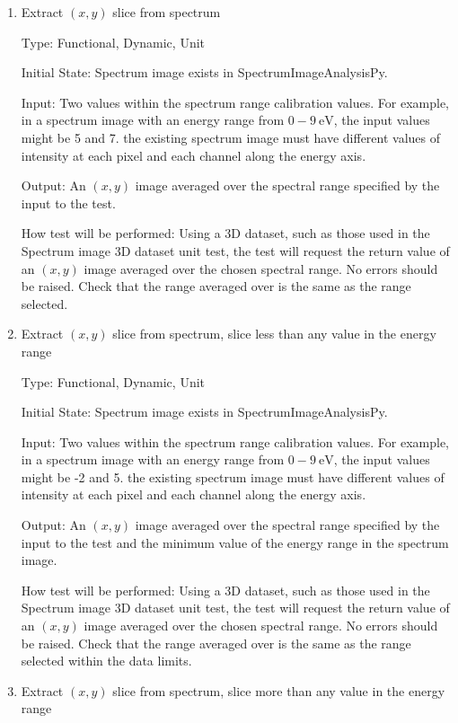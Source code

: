 \documentclass[12pt, titlepage]{article}
\newcommand{\progname}{SpectrumImageAnalysisPy}
\begin{document}
\begin{enumerate}

\item{Extract $(x,y)$ slice from spectrum}

Type: Functional, Dynamic, Unit

Initial State: Spectrum image exists in \progname{}.

Input: Two values within the spectrum range calibration values. For example, in a spectrum image with an energy range from $0-9\ \si{\electronvolt}$, the input values might be 5 and 7. the existing spectrum image must have different values of intensity at each pixel and each channel along the energy axis.

Output: An $(x,y)$ image averaged over the spectral range specified by the input to the test.

How test will be performed: Using a 3D dataset, such as those used in the Spectrum image 3D dataset unit test, the test will request the return value of an $(x,y)$ image averaged over the chosen spectral range. No errors should be raised. Check that the range averaged over is the same as the range selected.


\item{Extract $(x,y)$ slice from spectrum, slice less than any value in the energy range}

Type: Functional, Dynamic, Unit

Initial State: Spectrum image exists in \progname{}.

Input: Two values within the spectrum range calibration values. For example, in a spectrum image with an energy range from $0-9\ \si{\electronvolt}$, the input values might be -2 and 5. the existing spectrum image must have different values of intensity at each pixel and each channel along the energy axis.

Output: An $(x,y)$ image averaged over the spectral range specified by the input to the test and the minimum value of the energy range in the spectrum image.

How test will be performed: Using a 3D dataset, such as those used in the Spectrum image 3D dataset unit test, the test will request the return value of an $(x,y)$ image averaged over the chosen spectral range. No errors should be raised. Check that the range averaged over is the same as the range selected within the data limits.


\item{Extract $(x,y)$ slice from spectrum, slice more than any value in the energy range}


\end{enumerate}
\end{document}

